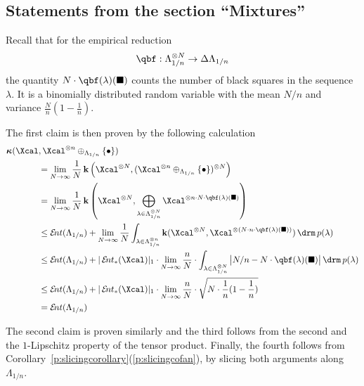 \def\thesubsection{\thesection.\ref{s:mixtures}}
\subsection{Statements from the section ``Mixtures''}
\begin{Proof}
  Recall that for the empirical reduction
  \[
  \emp:\Lambda_{1/n}^{\otimes N}\to\Delta\Lambda_{1/n}
  \]
  the quantity $N\cdot\emp(\lambda)(\blacksquare)$ counts the number of
  black squares in the sequence $\lambda$. It is a binomially
  distributed random variable with the mean $N/n$ and variance
  $\frac{N}{n}(1-\frac1n)$.
  
  The first claim is then proven by the following calculation
  \begin{align*}
    \aikd(\Xcal&,\Xcal^{\otimes n}\oplus_{\Lambda_{1/n}}\set{\bullet})
    \\
    &=
    \lim_{N\to\infty}
      \frac1N
        \ikd\left(
          \Xcal^{\otimes N},
          (\Xcal^{\otimes n}\oplus_{\Lambda_{1/n}}\set{\bullet})^{\otimes N}
        \right)
    \\
    &=
    \lim_{N\to\infty}
      \frac1N
        \ikd\left(
          \Xcal^{\otimes N},
          \bigoplus_{\lambda\in\Lambda_{1/n}^{\otimes N}}
              \Xcal^{\otimes n\cdot N\cdot \emp(\lambda)(\blacksquare)}
        \right)
    \\
    &\leq
    \ent(\Lambda_{1/n}) +
    \lim_{N\to\infty}
      \frac1N
      \int_{\lambda\in\Lambda^{\otimes n}_{1/n}}
        \ikd(\Xcal^{\otimes N},
             \Xcal^{\otimes(N\cdot n\cdot \emp(\lambda)(\blacksquare))})
      \d p(\lambda)
    \\
    &\leq
    \ent(\Lambda_{1/n}) +
    |\ent_{*}(\Xcal)|_{1}\cdot
    \lim_{N\to\infty}
      \frac{n}{N}
      \cdot
      \int_{\lambda\in\Lambda_{1/n}^{\otimes N}}
         \big|N/n- N\cdot \emp(\lambda)(\blacksquare)\big|
         \d p(\lambda)
    \\
    &\leq
    \ent(\Lambda_{1/n}) +
    |\ent_{*}(\Xcal)|_{1}\cdot
    \lim_{N\to\infty}
      \frac{n}{N}\cdot\sqrt{N\cdot\frac1n(1-\frac1n)}
    \\
    &=
    \ent(\Lambda_{1/n})
  \end{align*}

  The second claim is proven similarly and the third follows from the
  second and the $1$-Lipschitz property of the tensor
  product. Finally, the fourth follows from
  Corollary~\ref{p:slicingcorollary}(\ref{p:slicingcofan}), by slicing
  both arguments along $\Lambda_{1/n}$.
\end{Proof}


